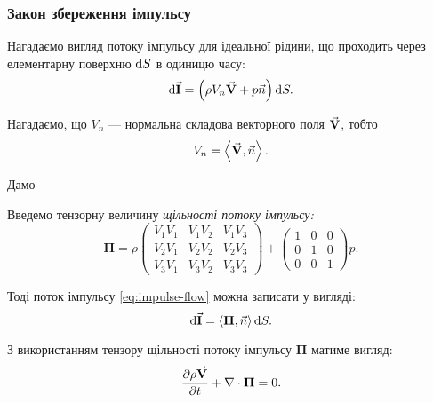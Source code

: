 \subsubsection{Закон збереження імпульсу}

Нагадаємо вигляд потоку імпульсу для ідеальної рідини, що проходить через елементарну поверхню $\mathop{}\!\mathrm{d} S$ в одиницю часу:
\begin{equation}
	\label{eq:impulse-flow}
	\mathop{}\!\mathrm{d} {\vec{\mathbf{I}}} = \Big(\rho V_n {\vec{\mathbf{V}}} + p \vec n \Big) \mathop{}\!\mathrm{d} S.
\end{equation}

\begin{remark}
	Нагадаємо, що $V_n$ --- нормальна складова векторного поля ${\vec{\mathbf{V}}}$, тобто
	\begin{equation}
		V_n = \langle \vecf V, \vec n \rangle.
	\end{equation}
\end{remark}

Дамо
\begin{definition}
	Введемо тензорну величину \it{щільності потоку імпульсу}:
	\begin{equation}
		\bm{\Pi} = \rho 
		\begin{pmatrix}
			V_1 V_1 & V_1 V_2 & V_1 V_3 \\
			V_2 V_1 & V_2 V_2 & V_2 V_3 \\
			V_3 V_1 & V_3 V_2 & V_3 V_3
		\end{pmatrix}
		+
		\begin{pmatrix}
			1 & 0 & 0 \\
			0 & 1 & 0 \\
			0 & 0 & 1
		\end{pmatrix}
		p.
	\end{equation}
\end{definition}

Тоді поток імпульсу \eqref{eq:impulse-flow} можна записати у вигляді: 
\begin{equation}
	\diff \vecf I = \langle \bm{\Pi}, \vec n \rangle \diff S.
\end{equation}

\begin{law}
	\label{law:impulse-conservation-ideal-liquid}
	З використанням тензору щільності потоку імпульсу $\bm{\Pi}$ матиме вигляд:
	\begin{equation}
		\label{eq:impulse-conservation-ideal-liquid}
		\frac{\partial \rho {\vec{\mathbf{V}}}}{\partial t} + \nabla \cdot \bm{\Pi} = 0.
	\end{equation}
\end{law}

